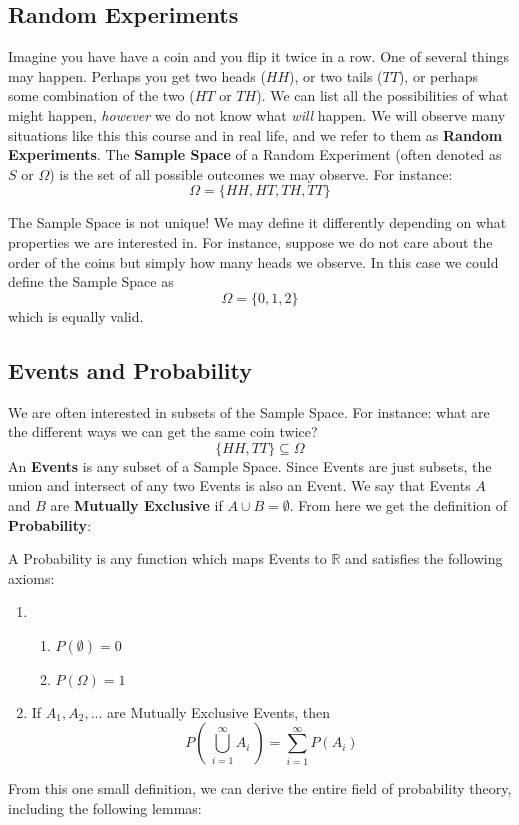 \documentclass{report}
\begin{document}
\subsection{Random Experiments}
Imagine you have have a coin and you flip it twice in a row. One of several things may happen. Perhaps you get two heads ($HH$), or two tails ($TT$), or perhaps some combination of the two ($HT$ or $TH$). We can list all the possibilities of what might happen, \emph{however} we do not know what \emph{will} happen. We will observe many situations like this this course and in real life, and we refer to them as \textbf{Random Experiments}. The \textbf{Sample Space} of a Random Experiment (often denoted as $S$ or $\Omega$) is the set of all possible outcomes we may observe. For instance:
\[
    \Omega=\{HH,HT,TH,TT\}
\]
\begin{notsofast}
The Sample Space is not unique! We may define it differently depending on what properties we are interested in. For instance, suppose we do not care about the order of the coins but simply how many heads we observe. In this case we could define the Sample Space as
\[
    \Omega=\{0,1,2\}
\]
which is equally valid.
\end{notsofast}
\subsection{Events and Probability}
We are often interested in subsets of the Sample Space. For instance: what are the different ways we can get the same coin twice?
\[
    \{HH,TT\}\subseteq \Omega
\]
An \textbf{Events} is any subset of a Sample Space. Since Events are just subsets, the union and intersect of any two Events is also an Event. We say that Events $A$ and $B$ are \textbf{Mutually Exclusive} if $A\cup B=\emptyset$. From here we get the definition of \textbf{Probability}:
\begin{definition}[Probability]
A Probability is any function which maps Events to $\mathbb R$ and satisfies the following axioms:
\begin{enumerate}
    \item 
    \begin{enumerate}
        \item $P(\emptyset) = 0$
        \item $P(\Omega)=1$
    \end{enumerate}
    \item If $A_1, A_2,...$ are Mutually Exclusive Events, then
    \[
        P\left(\ \bigcup_{i=1}^\infty A_i\ \right) = \sum_{i=1}^\infty P(A_i)
    \]
\end{enumerate}
\end{definition}
\label{def:probability}
From this one small definition, we can derive the entire field of probability theory, including the following lemmas:
\end{document}

